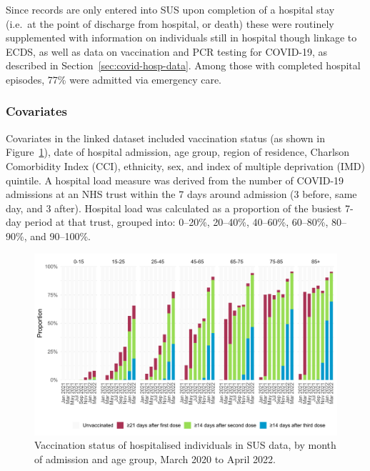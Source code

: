 Since records are only entered into SUS upon completion of a hospital stay (i.e.\ at the point of discharge from hospital, or death) these were routinely supplemented with information on individuals still in hospital though linkage to ECDS, as well as data on vaccination and PCR testing for COVID-19, as described in Section~\ref{sec:covid-hosp-data}. Among those with completed hospital episodes, 77\% were admitted via emergency care.

\subsubsection{Covariates}

Covariates in the linked dataset included vaccination status (as shown in Figure~\ref{fig:sus_vaccine_month}), date of hospital admission, age group, region of residence, Charlson Comorbidity Index (CCI)\parencite{Charlson1987-nz}, ethnicity, sex, and index of multiple deprivation (IMD) quintile. A hospital load measure was derived from the number of COVID-19 admissions at an NHS trust within the 7 days around admission (3 before, same day, and 3 after). Hospital load was calculated as a proportion of the busiest 7-day period at that trust, grouped into: 0--20\%, 20--40\%, 40--60\%, 60--80\%, 80--90\%, and 90--100\%.

\begin{figure}[htbp!]
    \centering
    \includegraphics[width=\textwidth]{sus_vaccine_month.pdf}
    \caption[Vaccination status of hospitalised individuals in SUS data, by month of admission and age group, March 2020 to April 2022]{Vaccination status of hospitalised individuals in SUS data, by month of admission and age group, March 2020 to April 2022.}\label{fig:sus_vaccine_month}
\end{figure}

